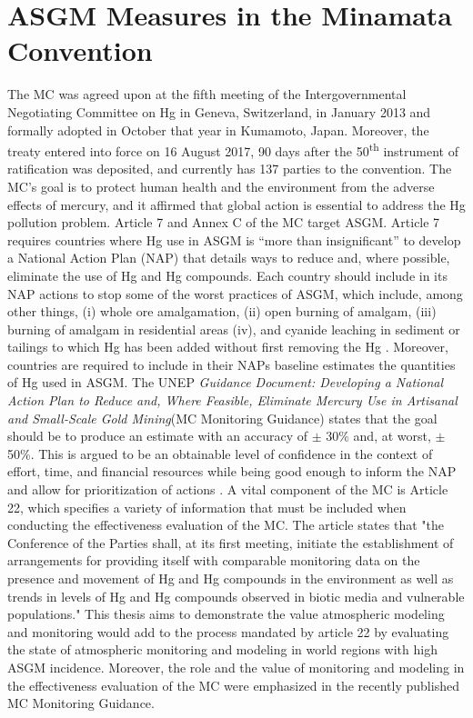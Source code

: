 \section{ASGM Measures in the Minamata Convention}
\begin{flushleft}
    

The MC was agreed upon at the fifth meeting of the Intergovernmental Negotiating Committee on Hg in Geneva, Switzerland, in January 2013 and formally adopted in October that year in Kumamoto, Japan. Moreover, the treaty entered into force on 16 August 2017, 90 days after the 50\textsuperscript{th} instrument of ratification was deposited, and currently has 137 parties to the convention\cite{unep_minamata_2013}. The MC's goal is to protect human health and the environment from the adverse effects of mercury, and it affirmed that global action is essential to address the Hg pollution problem. Article 7 and Annex C of the MC target ASGM. Article 7 requires countries where Hg use in ASGM is “more than insignificant” to develop a National Action Plan (NAP) that details ways to reduce and, where possible, eliminate the use of Hg and Hg compounds. Each country should include in its NAP actions to stop some of the worst practices of ASGM, which include, among other things, (i) whole ore amalgamation, (ii) open burning of amalgam, (iii) burning of amalgam in residential areas (iv), and cyanide leaching in sediment or tailings to which Hg has been added without first removing the Hg \cite{united_nations_environment_programme_technical_2019}.
Moreover, countries are required to include in their NAPs baseline estimates the quantities of Hg used in ASGM. The UNEP \textit{Guidance Document: Developing a National Action Plan to Reduce and, Where Feasible, Eliminate Mercury Use in Artisanal and Small-Scale Gold Mining}(MC Monitoring Guidance) \cite{unep_developing_2017} states that the goal should be to produce an estimate with an accuracy of $\pm$ 30\% and, at worst, $\pm$ 50\%.  This is argued to be an obtainable level of confidence in the context of effort, time, and financial resources while being good enough to inform the NAP and allow for prioritization of actions \cite{unep_developing_2017}. A vital component of the MC is Article 22, which specifies a variety of information that must be included when conducting the effectiveness evaluation of the MC. The article states that "the Conference of the Parties shall, at its first meeting, initiate the establishment of arrangements for providing itself with comparable monitoring data on the presence and movement of Hg and Hg compounds in the environment as well as trends in levels of Hg and Hg compounds observed in biotic media and vulnerable populations." This thesis aims to demonstrate the value atmospheric modeling and monitoring would add to the process mandated by article 22 by evaluating the state of atmospheric monitoring and modeling in world regions with high ASGM incidence. Moreover, the role and the value of monitoring and modeling in the effectiveness evaluation of the MC were emphasized in the recently published MC Monitoring Guidance\cite{unep_guidance_2021}. 
\end{flushleft}

